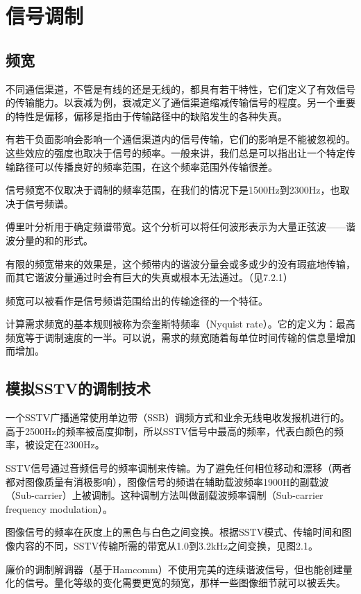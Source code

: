 \section{信号调制}

\subsection{频宽}

不同通信渠道，不管是有线的还是无线的，都具有若干特性，它们定义了有效信号的传输能力。以衰减为例，衰减定义了通信渠道缩减传输信号的程度。另一个重要的特性是偏移，偏移是指由于传输路径中的缺陷发生的各种失真。

有若干负面影响会影响一个通信渠道内的信号传输，它们的影响是不能被忽视的。这些效应的强度也取决于信号的频率。一般来讲，我们总是可以指出让一个特定传输路径可以传播良好的频率范围，在这个频率范围外传输很差。

信号频宽不仅取决于调制的频率范围，在我们的情况下是1500Hz到2300Hz，也取决于信号频谱。

傅里叶分析用于确定频谱带宽。这个分析可以将任何波形表示为大量正弦波——谐波分量的和的形式。

有限的频宽带来的效果是，这个频带内的谐波分量会或多或少的没有瑕疵地传输，而其它谐波分量通过时会有巨大的失真或根本无法通过。（见7.2.1）

频宽可以被看作是信号频谱范围给出的传输途径的一个特征。

计算需求频宽的基本规则被称为奈奎斯特频率（Nyquist rate）。它的定义为：最高频宽等于调制速度的一半。可以说，需求的频宽随着每单位时间传输的信息量增加而增加。

\subsection{模拟SSTV的调制技术}

一个SSTV广播通常使用单边带（SSB）调频方式和业余无线电收发报机进行的。高于2500Hz的频率被高度抑制，所以SSTV信号中最高的频率，代表白颜色的频率，被设定在2300Hz。

SSTV信号通过音频信号的频率调制来传输。为了避免任何相位移动和漂移（两者都对图像质量有消极影响），图像信号的频谱在辅助载波频率1900H的副载波（Sub-carrier）上被调制。这种调制方法叫做副载波频率调制（Sub-carrier frequency modulation）。

图像信号的频率在灰度上的黑色与白色之间变换。根据SSTV模式、传输时间和图像内容的不同，SSTV传输所需的带宽从1.0到3.2kHz之间变换，见图2.1。

廉价的调制解调器（基于Hamcomm）不使用完美的连续谐波信号，但也能创建量化的信号。量化等级的变化需要更宽的频宽，那样一些图像细节就可以被丢失。

